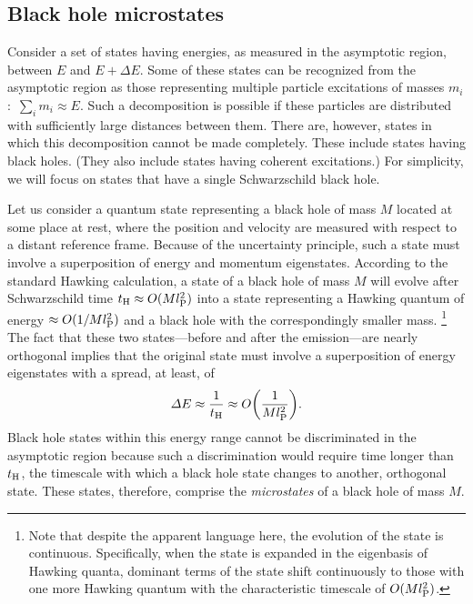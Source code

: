 \documentclass[12pt]{article}
\begin{document}
\subsection{Black hole microstates}
\label{subsec:micro}

Consider a set of states having energies, as measured in the 
asymptotic region, between $E$ and $E + \varDelta E$.  Some of 
these states can be recognized from the asymptotic region as those 
representing multiple particle excitations of masses $m_i$:\ 
$\sum_i m_i \approx E$.  Such a decomposition is possible if these 
particles are distributed with sufficiently large distances between 
them.  There are, however, states in which this decomposition cannot 
be made completely.  These include states having black holes.  (They 
also include states having coherent excitations.)  For simplicity, 
we will focus on states that have a single Schwarzschild black hole.

Let us consider a quantum state representing a black hole of mass 
$M$ located at some place at rest, where the position and velocity 
are measured with respect to a distant reference frame.  Because of 
the uncertainty principle, such a state must involve a superposition 
of energy and momentum eigenstates.  According to the standard Hawking 
calculation, a state of a black hole of mass $M$ will evolve after 
Schwarzschild time $t_{\rm H} \approx O(M l_{\rm P}^2)$ into a state 
representing a Hawking quantum of energy $\approx O(1/M l_{\rm P}^2)$ 
and a black hole with the correspondingly smaller mass.%
\footnote{Note that despite the apparent language here, the evolution 
 of the state is continuous.  Specifically, when the state is 
 expanded in the eigenbasis of Hawking quanta, dominant terms 
 of the state shift continuously to those with one more Hawking 
 quantum with the characteristic timescale of $O(M l_{\rm P}^2)$.}
The fact that these two states---before and after the emission---are 
nearly orthogonal implies that the original state must involve a 
superposition of energy eigenstates with a spread, at least, of
%
\begin{equation}
  \varDelta E \approx \frac{1}{t_{\rm H}} 
    \approx O\biggl(\frac{1}{M l_{\rm P}^2}\biggr).
\label{eq:delta-E}
\end{equation}
%
Black hole states within this energy range cannot be discriminated 
in the asymptotic region because such a discrimination would require 
time longer than $t_{\rm H}$, the timescale with which a black hole 
state changes to another, orthogonal state.  These states, therefore, 
comprise the {\it microstates} of a black hole of mass $M$.
\end{document}
